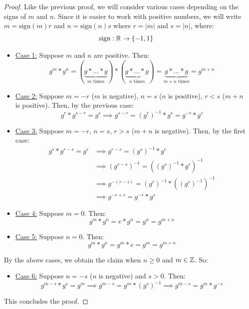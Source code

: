 \documentclass[letterpaper]{article}
\begin{document}
\begin{mdframed}
    \begin{proof}
        Like the previous proof, we will consider various cases depending on the signs of $m$ and $n$. Since it is easier to work with positive numbers, we will write $m = \text{sign}(m) r$ and $n = \text{sign}(n) s$ where $r = |m|$ and $s = |n|$, where: 
        \[\text{sign}: \mathbb{R} \to \{-1, 1\}\]
        \begin{itemize}
            \item \underline{Case 1:} Suppose $m$ and $n$ are positive. Then: 
            \[g^m * g^n = (\underbrace{g * \dots * g}_{m \text{ times}}) * (\underbrace{g * \dots * g}_{n \text{ times}}) = \underbrace{g * \dots * g}_{m + n \text{ times}} = g^{m + n}\]
    
            \item \underline{Case 2:} Suppose $m = -r$ ($m$ is negative), $n = s$ ($n$ is positive), $r < s$ ($m + n$ is positive). Then, by the previous case:
            \[g^r * g^{s - r} = g^s \implies g^{s - r} = (g^r)^{-1} * g^s = g^{-r} * g^s\]  
    
            \item \underline{Case 3:} Suppose $m = -r$, $n = s$, $r > s$ ($m + n$ is negative). Then, by the first case: 
            \begin{equation*}
                \begin{aligned}
                    g^s * g^{r - s} = g^r &\implies g^{r - s} = (g^s)^{-1} * g^r \\ 
                        &\implies (g^{r - s})^{-1} = ((g^s)^{-1} * g^r)^{-1} \\ 
                        &\implies g^{-(r - s)} = (g^r)^{-1} * ((g^s)^{-1})^{-1} \\ 
                        &\implies g^{-r + s} = g^{-r} * g^s
                \end{aligned}
            \end{equation*}
    
            \item \underline{Case 4:} Suppose $m = 0$. Then: 
            \[g^m * g^n  = e * g^n = g^n = g^{m + n}\]
    
            \item \underline{Case 5:} Suppose $n = 0$. Then: 
            \[g^m * g^n = g^m * e = g^m = g^{m + n}\]
        \end{itemize}
        By the above cases, we obtain the claim when $n \geq 0$ and $m \in \mathbb{Z}$. So: 
        \begin{itemize}
            \item \underline{Case 6:} Suppose $n = -s$ ($n$ is negative) and $s > 0$. Then: 
            \[g^{m - s} * g^s = g^m \implies g^{m - s} = g^m * (g^s)^{-1} \implies g^{m - s} = g^m * g^{-s}\]
        \end{itemize}
        This concludes the proof. 
    \end{proof}
\end{mdframed}
\end{document}
